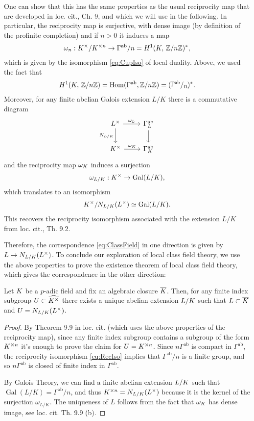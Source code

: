 \documentclass[a4paper, oneside]{memoir}
\begin{document}
\begin{remark}
	One can show that this has the same properties as the usual reciprocity map that are developed in loc. cit., Ch. 9, and which we will use in the following. In particular, the reciprocity map is surjective, with dense image (by definition of the profinite completion) and if $n>0$ it induces a map
	\begin{equation}\label{eq:RecIso}
		\omega_n:K^\times / K^{\times n} \to \Gamma^{\text{ab}}/n = H^{1}( K, \, \mathbb{Z}/n\mathbb{Z} )^*,
	\end{equation}
	which is given by the isomorphism \eqref{eq:CupIso} of local duality. Above, we used the fact that $$\H{1}{\K}{\Zn}=
		\Hom(\Gamma^{\text{ab}},\Zn)=(\sfrac{\Gamma^{\text{ab}}}{n})^*.$$
	Moreover, for any finite abelian Galois extension $L / K$ there is a commutative diagram
	\[
		\begin{tikzcd}\label{eq:NormDiag}
			L^\times \ar[r, "\omega_L"] \ar[d, swap, "N_{L/\K}"] & \Gamma_L^{\text{ab}} \ar[d] \\
			K^\times \ar[r, "\omega_K"]       & \Gamma_K^{\text{ab}}
		\end{tikzcd}
	\]
	and the reciprocity map $\omega_K$ induces a surjection
	\[
		\omega_{L/K}:K^\times \to \operatorname{Gal}(L/K),
	\]
	which translates to an isomorphism $$K^\times / N_{L/K}(L^\times) \simeq \operatorname{Gal}(L/K).$$ This recovers the reciprocity isomorphism associated with the extension $L/K$ from loc. cit., Th. 9.2.
\end{remark}

Therefore, the correspondence \eqref{eq:ClassField} in one direction is given by $L \mapsto N_{L/K}(L^\times)$. To conclude our exploration of local class field theory, we use the above properties to prove the existence theorem of local class field theory, which gives the correspondence in the other direction:

\begin{theorem}
	Let $K$ be a $p$-adic field and fix an algebraic closure $\overline{K}$. Then, for any finite index subgroup $U\subset\widehat{K^\times}$
	there exists a unique abelian extension $L / K$ such that $L \subset \overline{K}$ and $U=N_{L/K}(L^\times)$.
\end{theorem}

\begin{proof}
	By Theorem 9.9 in loc. cit. (which uses the above properties of the reciprocity map), since any finite index subgroup contains a subgroup of the form $K^{\times n}$ it's enough to prove the claim for $U=K^{\times n}$. Since $n\Gamma^{\text{ab}}$ is compact in $\Gamma^{\text{ab}}$, the reciprocity isomorphism \eqref{eq:RecIso} implies that $\Gamma^{\text{ab}}/n$ is a finite group, and so $n\Gamma^{\text{ab}}$ is closed of finite index in $\Gamma^{\text{ab}}$.

	By Galois Theory, we can find a finite abelian extension $L/K$ such that $\operatorname{Gal}{(L/K)}=\Gamma^{\text{ab}}/n$, and thus $K^{\times n}=N_{L/K}(L^\times)$ because it is the kernel of the surjection $\omega_{L/K}$. The uniqueness of $L$ follows from the fact that $\omega_K$ has dense image, see loc. cit. Th. 9.9 (b).
\end{proof}

\nocite{*}
\printbibliography
\end{document}
